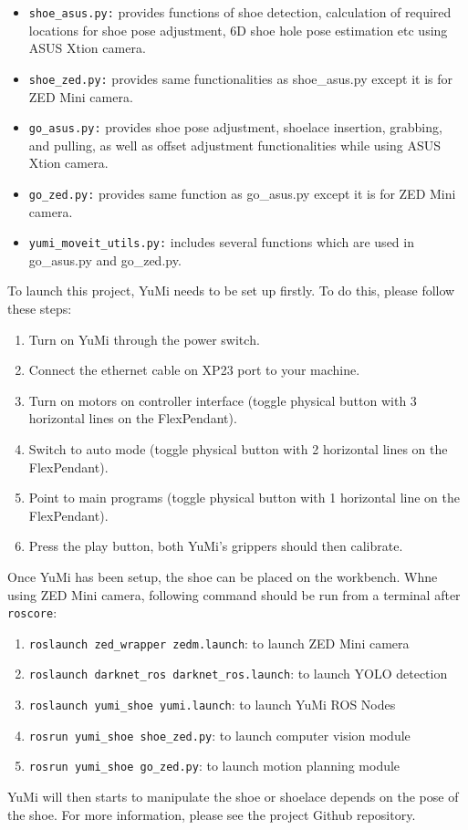 \begin{itemize}
    \item \texttt{shoe\_asus.py:} provides functions of shoe detection, calculation of required locations for shoe pose adjustment, 6D shoe hole pose estimation etc using ASUS Xtion camera.
    \item \texttt{shoe\_zed.py:} provides same functionalities as shoe\_asus.py except it is for ZED Mini camera.
    
    \item \texttt{go\_asus.py:} provides shoe pose adjustment, shoelace insertion, grabbing, and pulling, as well as offset adjustment functionalities while using ASUS Xtion camera.
    \item \texttt{go\_zed.py:} provides same function as go\_asus.py except it is for ZED Mini camera.
    \item \texttt{yumi\_moveit\_utils.py:} includes several functions which are used in go\_asus.py and go\_zed.py.
\end{itemize}

To launch this project, YuMi needs to be set up firstly. To do this, please follow these steps:
\begin{enumerate}
\item Turn on YuMi through the power switch.
\item Connect the ethernet cable on XP23 port to your machine.
\item Turn on motors on controller interface (toggle physical button with 3 horizontal lines on the FlexPendant).
\item Switch to auto mode (toggle physical button with 2 horizontal lines on the FlexPendant).
\item Point to main programs (toggle physical button with 1 horizontal line on the FlexPendant).
\item Press the play button, both YuMi's grippers should then calibrate.
\end{enumerate}

Once YuMi has been setup, the shoe can be placed on the workbench. Whne using ZED Mini camera, following command should be run from a terminal after \texttt{roscore}:
\begin{enumerate}
\item \texttt{roslaunch zed\_wrapper zedm.launch}: to launch ZED Mini camera
\item \texttt{roslaunch darknet\_ros darknet\_ros.launch}: to launch YOLO detection
\item \texttt{roslaunch yumi\_shoe yumi.launch}: to launch YuMi ROS Nodes
\item \texttt{rosrun yumi\_shoe shoe\_zed.py}: to launch computer vision module
\item \texttt{rosrun yumi\_shoe go\_zed.py}: to launch motion planning module
\end{enumerate}

YuMi will then starts to manipulate the shoe or shoelace depends on the pose of the shoe. For more information, please see the project Github repository.
